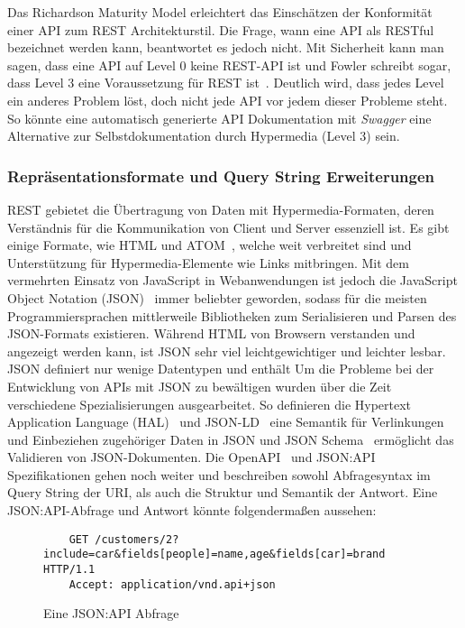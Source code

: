 \par
Das Richardson Maturity Model erleichtert das Einschätzen der Konformität einer API zum REST Architekturstil.
Die Frage, wann eine API als RESTful bezeichnet werden kann, beantwortet es jedoch nicht.
Mit Sicherheit kann man sagen, dass eine API auf Level 0 keine REST-API ist und Fowler schreibt sogar, dass Level 3 eine Voraussetzung für REST ist~\cite[vgl.][]{Fowler}.
Deutlich wird, dass jedes Level ein anderes Problem löst, doch nicht jede API vor jedem dieser Probleme steht.
So könnte eine automatisch generierte API Dokumentation mit \emph{Swagger}\cite{Swagger} eine Alternative zur Selbstdokumentation durch Hypermedia (Level 3) sein.

\subsubsection{Repräsentationsformate und Query String Erweiterungen}
REST gebietet die Übertragung von Daten mit Hypermedia-Formaten, deren Verständnis für die Kommunikation von Client und Server essenziell ist.
Es gibt einige Formate, wie HTML und ATOM~\cite{RFC5023}, welche weit verbreitet sind und Unterstützung für Hypermedia-Elemente wie Links mitbringen.
Mit dem vermehrten Einsatz von JavaScript in Webanwendungen ist jedoch die JavaScript Object Notation (JSON)~\cite{RFC8259} immer beliebter geworden, sodass für die meisten Programmiersprachen mittlerweile Bibliotheken zum Serialisieren und Parsen des JSON-Formats existieren.
Während HTML von Browsern verstanden und angezeigt werden kann, ist JSON sehr viel leichtgewichtiger und leichter lesbar.
JSON definiert nur wenige Datentypen und enthält 
Um die Probleme bei der Entwicklung von APIs mit JSON zu bewältigen wurden über die Zeit verschiedene Spezialisierungen ausgearbeitet.
So definieren die Hypertext Application Language (HAL)~\cite{HAL} und JSON-LD~\cite{JSON-LD} eine Semantik für Verlinkungen und Einbeziehen zugehöriger Daten in JSON und JSON Schema~\cite{JSON-Schema} ermöglicht das Validieren von JSON-Dokumenten.
Die OpenAPI~\cite{OpenAPI} und JSON:API~\cite{JSON:API} Spezifikationen gehen noch weiter und beschreiben sowohl Abfragesyntax im Query String der URI, als auch die Struktur und Semantik der Antwort.
Eine JSON:API-Abfrage und Antwort könnte folgendermaßen aussehen:
\begin{figure}[h]
  \centering
  \begin{verbatim}
    GET /customers/2?include=car&fields[people]=name,age&fields[car]=brand HTTP/1.1
    Accept: application/vnd.api+json
  \end{verbatim}
  \caption{Eine JSON:API Abfrage}\label{code:jsonApiReq}
\end{figure}
